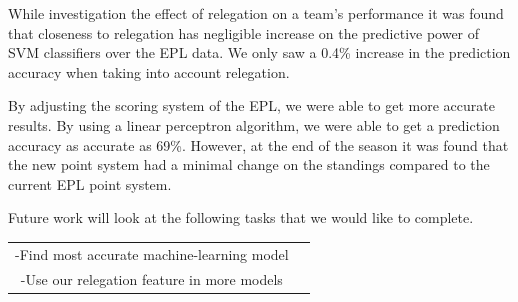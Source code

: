 \documentclass[conference]{IEEEtran}
\begin{document}
While investigation the effect of relegation on a team's performance it was found that closeness to relegation has negligible increase on the predictive power of SVM classifiers over the EPL data. We only saw a 0.4\% increase in the prediction accuracy when taking into account relegation.

By adjusting the scoring system of the EPL, we were able to get more accurate results. By using a linear perceptron algorithm, we were able to get a prediction accuracy as accurate as 69\%. However, at the end of the season it was found that the new point system had a minimal change on the standings compared to the current EPL point system.

Future work will look at the following tasks that we would like to complete.\begin{center}
 \begin{tabular}{@{} cc @{}} 
   \hline
       -Find most accurate machine-learning model\\ 
       -Use our relegation feature in more models\\  
   \hline
 \end{tabular}
\end{center}
\hfill

\end{document}
